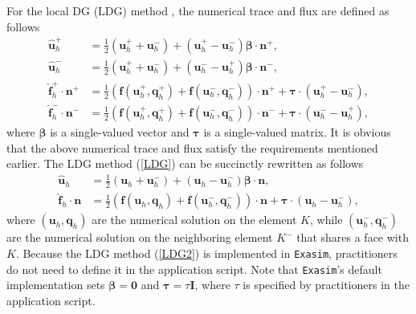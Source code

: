 \documentclass[11pt]{article}
\begin{document}
For the local DG (LDG) method \cite{Cockburn1998}, the numerical trace and flux are defined  as follows
\begin{equation}
\label{LDG}
\begin{split}
\widehat{\bm{u}}_h^+  &= \frac{1}{2} (\bm u_h^{+} + \bm u_h^{-}) +  (\bm u_h^+ - \bm u_h^-) \bm \beta \cdot \bm n^+ , \\
\widehat{\bm{u}}_h^-  &= \frac{1}{2} (\bm u_h^{+} + \bm u_h^{-}) +  (\bm u_h^- - \bm u_h^+) \bm \beta \cdot \bm n^- , \\
\widehat{\bm{f}}_h^+ \cdot \bm n^+ & = \frac{1}{2} \left( \bm{f}(\bm u_h^+ , \bm{q}_h^+)  + \bm{f}(\bm u_h^- , \bm{q}_h^-)  \right) \cdot \bm{n}^+ + \bm{\tau} \cdot ( \bm{u}_h^+ - {\bm{u}}_h^- ) , \\
\widehat{\bm{f}}_h^- \cdot \bm n^- & = \frac{1}{2} \left( \bm{f}(\bm u_h^+ , \bm{q}_h^+)  + \bm{f}(\bm u_h^- , \bm{q}_h^-)  \right) \cdot \bm{n}^- + \bm{\tau} \cdot ( \bm{u}_h^- - {\bm{u}}_h^+ ) ,
\end{split}
\end{equation}
where $\bm \beta$ is a single-valued vector and $\bm \tau$ is a single-valued matrix. It is obvious that the above numerical trace and flux satisfy the requirements mentioned earlier. The LDG method  (\ref{LDG}) can be succinctly rewritten as follows 
\begin{equation}
\label{LDG2}
\begin{split}
\widehat{\bm{u}}_h  &= \frac{1}{2} (\bm u_h + \bm u_h^{-}) +  (\bm u_h - \bm u_h^-) \bm \beta \cdot \bm n , \\
\widehat{\bm{f}}_h \cdot \bm n & = \frac{1}{2} \left( \bm{f}(\bm u_h , \bm{q}_h)  + \bm{f}(\bm u_h^- , \bm{q}_h^-)  \right) \cdot \bm{n} + \bm{\tau} \cdot ( \bm{u}_h - {\bm{u}}_h^- ) ,
\end{split}
\end{equation}
where $(\bm u_h , \bm q_h)$ are the numerical solution on the element $K$, while $(\bm u_h^- , \bm q_h^-)$ are the numerical solution on the neighboring element $K^-$ that shares a face with $K$. Because the LDG method (\ref{LDG2}) is implemented in \texttt{Exasim}, practitioners do not need to define it in the application script.  Note that \texttt{Exasim}'s default implementation sets $\bm \beta = \bm 0$ and $\bm{\tau} = \tau \bm{I}$, where $\tau$ is specified by practitioners in the application script.
\end{document}
